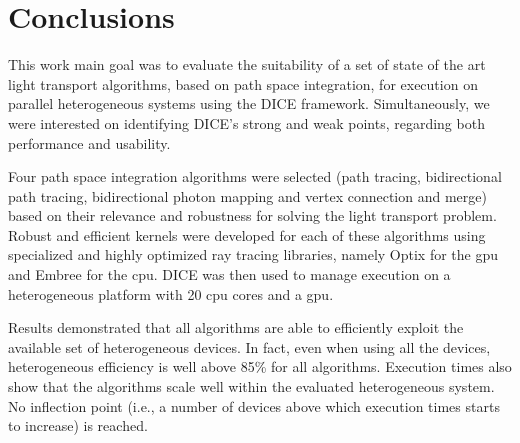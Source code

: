 \chapter{Conclusions}








This work main goal was to evaluate the suitability of a set of state of the art light transport algorithms, based on path space integration, for execution on parallel heterogeneous systems using the DICE framework. Simultaneously, we were interested on identifying DICE's strong and weak points, regarding both performance and usability.

Four path space integration algorithms were selected (path tracing, bidirectional path tracing, bidirectional photon mapping and vertex connection and merge) based on their relevance and robustness for solving the light transport problem. Robust and efficient kernels were developed for each of these algorithms using specialized and highly optimized ray tracing libraries, namely Optix for the \gls{gpu} and Embree for the \gls{cpu}. DICE was then used to manage execution on a heterogeneous platform with 20 \gls{cpu} cores and a \gls{gpu}.

Results demonstrated that all algorithms are able to efficiently exploit the available set of heterogeneous devices.  In fact, even when using all the devices, heterogeneous efficiency is well above 85\% for all algorithms. Execution times also show that the algorithms scale well within the evaluated heterogeneous system. No inflection point (i.e., a number of devices above which execution times starts to increase) is reached.

